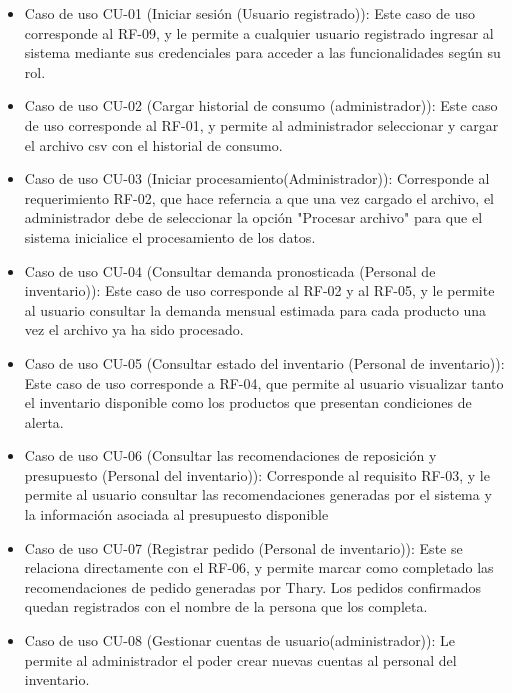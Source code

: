 \begin{itemize}

    \item Caso de uso CU-01 (Iniciar sesión (Usuario registrado)): Este caso de uso corresponde al RF-09, y le permite a cualquier usuario registrado ingresar al sistema mediante sus credenciales para acceder a las funcionalidades según su rol.

    \item Caso de uso CU-02 (Cargar historial de consumo (administrador)): Este caso de uso corresponde al RF-01, y permite al administrador seleccionar y cargar el archivo csv con el historial de consumo.

    \item Caso de uso CU-03 (Iniciar procesamiento(Administrador)): Corresponde al requerimiento RF-02, que hace referncia a que una vez cargado el archivo, el administrador debe de seleccionar la opción "Procesar archivo" para que el sistema inicialice el procesamiento de los datos. 

    \item Caso de uso CU-04 (Consultar demanda pronosticada (Personal de inventario)): Este caso de uso corresponde al RF-02 y al RF-05, y le permite al usuario consultar la demanda mensual estimada para cada producto una vez el archivo ya ha sido procesado.

    \item Caso de uso CU-05 (Consultar estado del inventario (Personal de inventario)): Este caso de uso corresponde a RF-04, que permite al usuario visualizar tanto el inventario disponible como los productos que presentan condiciones de alerta.

    \item Caso de uso CU-06 (Consultar las recomendaciones de reposición y presupuesto (Personal del inventario)): Corresponde al requisito RF-03, y le permite al usuario consultar las recomendaciones generadas por el sistema y la información asociada al presupuesto disponible

    \item Caso de uso CU-07 (Registrar pedido (Personal de inventario)): Este se relaciona directamente con el RF-06, y permite marcar como completado las recomendaciones de pedido generadas por Thary. Los pedidos confirmados quedan registrados con el nombre de la persona que los completa.

    \item Caso de uso CU-08 (Gestionar cuentas de usuario(administrador)): Le permite al administrador el poder crear nuevas cuentas al personal del inventario.
    

\end{itemize}
